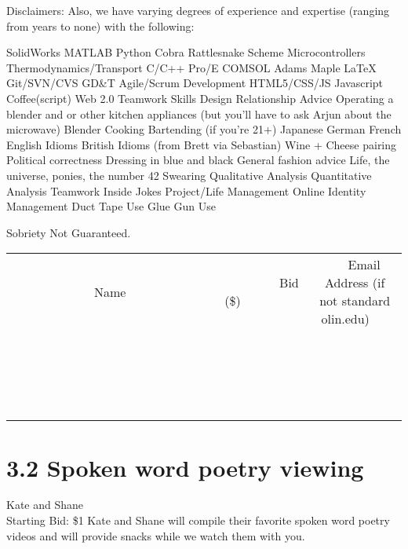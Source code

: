 \documentclass[11pt]{article}
\begin{document}
Disclaimers: Also, we have varying degrees of experience and expertise (ranging from years to none) with the following:

SolidWorks
MATLAB
Python
Cobra
Rattlesnake
Scheme
Microcontrollers
Thermodynamics/Transport
C/C++
Pro/E
COMSOL
Adams
Maple
LaTeX
Git/SVN/CVS
GD\&T
Agile/Scrum Development
HTML5/CSS/JS
Javascript
Coffee(script)
Web  2.0
Teamwork Skills
Design
Relationship Advice
Operating a blender and or other kitchen appliances (but you'll have to ask Arjun about the microwave)
Blender
Cooking
Bartending (if you're 21+)
Japanese
German
French
English Idioms
British Idioms (from Brett via Sebastian)
Wine + Cheese pairing
Political correctness
Dressing in blue and black
General fashion advice
Life, the universe, ponies, the number 42
Swearing
Qualitative Analysis
Quantitative Analysis 
Teamwork
Inside Jokes
Project/Life Management
Online Identity Management
Duct Tape Use
Glue Gun Use

Sobriety Not Guaranteed.
\\[3ex]
\begin{tabular}{c c c}
~~~~~~~~~~~~~Name~~~~~~~~~~~~~ & ~~~~~~~~~Bid (\$)~~~~~~~~~  & ~~~Email Address (if not standard olin.edu)~~~\\
 & & \\
\hline
 & & \\
\hline
 & & \\
\hline
 & & \\
\hline
 & & \\
\hline
 & & \\
\hline
 & & \\
\hline
 & & \\
\hline
 & & \\
\hline
 & & \\
\hline
 & & \\
\hline
 & & \\
\hline
 & & \\
\hline
 & & \\
\hline
 & & \\
\hline
 & & \\
\hline
 & & \\
\hline
 & & \\
\hline
 & & \\
\hline
\end{tabular}
\newpage
\section*{3.2 Spoken word poetry viewing}
Kate and Shane
\\
Starting Bid: \$1
\newline
Kate and Shane will compile their favorite spoken word poetry videos and will provide snacks while we watch them with you.
\end{document}
